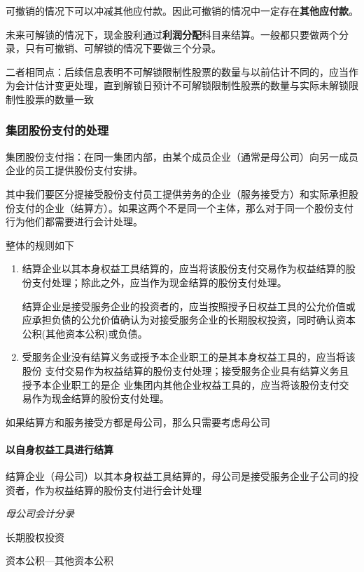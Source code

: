 \documentclass[UTF8,12pt]{ctexart}
\newenvironment{Dr}{%
	\begin{list}{}%
		{
			\setlength{\leftmargin}{2em}
			\setlength{\labelwidth}{2em}
			\setlength{\labelsep}{0pt}
			\setlength{\itemindent}{0pt}
			\setlength{\listparindent}{0pt}
			\setlength{\parsep}{0pt}
			\setlength{\topsep}{0pt}
		}
		\item[\textbf{借：}]
	}{%
	\end{list}
}
\newenvironment{Cr}{%
	\begin{list}{}%
		{
			\setlength{\leftmargin}{3em}
			\setlength{\labelwidth}{2em}
			\setlength{\labelsep}{0pt}
			\setlength{\itemindent}{0pt}
			\setlength{\listparindent}{0pt}
			\setlength{\parsep}{0pt}
			\setlength{\topsep}{0pt}
		}
		\item[\textbf{贷：}]
	}{%
	\end{list}
}
\numberwithin{equation}{section} %
\numberwithin{figure}{section}
\numberwithin{table}{section}
\begin{document}
	可撤销的情况下可以冲减其他应付款。因此可撤销的情况中一定存在\textbf{其他应付款}。
	
	未来可解锁的情况下，现金股利通过\textbf{利润分配}科目来结算。一般都只要做两个分录，只有可撤销、可解锁的情况下要做三个分录。
	
	二者相同点：后续信息表明不可解锁限制性股票的数量与以前估计不同的，应当作为会计估计变更处理，直到解锁日预计不可解锁限制性股票的数量与实际未解锁限制性股票的数量一致
	
	\subsubsection{集团股份支付的处理}
	集团股份支付指：在同一集团内部，由某个成员企业（通常是母公司）向另一成员企业的员工提供股份支付安排。
	
	其中我们要区分提接受股份支付员工提供劳务的企业（服务接受方）和实际承担股份支付的企业（结算方）。如果这两个不是同一个主体，那么对于同一个股份支付行为他们都需要进行会计处理。
	
	整体的规则如下
	\begin{enumerate}
		\item 结算企业以其本身权益工具结算的，应当将该股份支付交易作为权益结算的股份支付处理；除此之外，应当作为现金结算的股份支付处理。
		
		结算企业是接受服务企业的投资者的，应当按照授予日权益工具的公允价值或应承担负债的公允价值确认为对接受服务企业的长期股权投资，同时确认资本公积(其他资本公积)或负债。
		
		\item 受服务企业没有结算义务或授予本企业职工的是其本身权益工具的，应当将该股份
		支付交易作为权益结算的股份支付处理；接受服务企业具有结算义务且授予本企业职工的是企
		业集团内其他企业权益工具的，应当将该股份支付交易作为现金结算的股份支付处理。
	\end{enumerate}
	
	如果结算方和服务接受方都是母公司，那么只需要考虑母公司
	\paragraph{以自身权益工具进行结算}
	结算企业（母公司）以其本身权益工具结算的，母公司是接受服务企业子公司的投资者，作为权益结算的股份支付进行会计处理
	
	\textit{母公司会计分录}
	
	\begin{Dr}
		长期股权投资
	\end{Dr}
	\begin{Cr}
		资本公积—其他资本公积
	\end{Cr}
	
\end{document}
